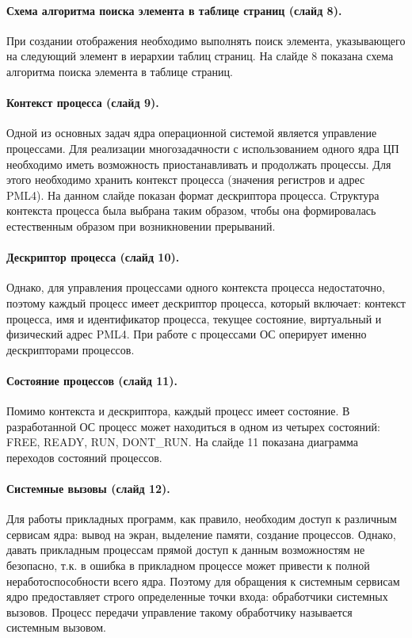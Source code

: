 \documentclass[12pt]{article}
\begin{document}
\paragraph{Схема алгоритма поиска элемента в таблице страниц (слайд 8).}
При создании отображения необходимо выполнять поиск элемента, указывающего на следующий элемент
в иерархии таблиц страниц. На слайде 8 показана схема алгоритма поиска элемента в таблице страниц.

\paragraph{Контекст процесса (слайд 9).}
Одной из основных задач ядра операционной системой является управление процессами.
Для реализации многозадачности с использованием одного ядра ЦП необходимо иметь возможность
приостанавливать и продолжать процессы. Для этого необходимо хранить контекст процесса
(значения регистров и адрес PML4). На данном слайде показан формат дескриптора процесса.
Структура контекста процесса была выбрана таким образом, чтобы она формировалась естественным
образом при возникновении прерываний.

\paragraph{Дескриптор процесса (слайд 10).}
Однако, для управления процессами одного контекста процесса недостаточно, поэтому каждый
процесс имеет дескриптор процесса, который включает: контекст процесса, имя и идентификатор процесса,
текущее состояние, виртуальный и физический адрес PML4. При работе с процессами ОС оперирует
именно дескрипторами процессов.

\paragraph{Состояние процессов (слайд 11).}
Помимо контекста и дескриптора, каждый процесс имеет состояние. В разработанной ОС процесс
может находиться в одном из четырех состояний: FREE, READY, RUN, DONT\_RUN. На слайде 11
показана диаграмма переходов состояний процессов.

\paragraph{Системные вызовы (слайд 12).}
Для работы прикладных программ, как правило, необходим доступ к различным сервисам ядра: вывод
на экран, выделение памяти, создание процессов. Однако, давать прикладным процессам прямой доступ
к данным возможностям не безопасно, т.к. в ошибка в прикладном процессе может привести к полной
неработоспособности всего ядра. Поэтому для обращения к системным сервисам ядро предоставляет
строго определенные точки входа: обработчики системных вызовов. Процесс передачи управление
такому обработчику называется системным вызовом.
\end{document}
